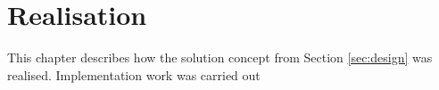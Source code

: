 \section{Realisation\label{sec:realisation}}

This chapter describes how the solution concept from Section \ref{sec:design} was realised.
Implementation work was carried out 